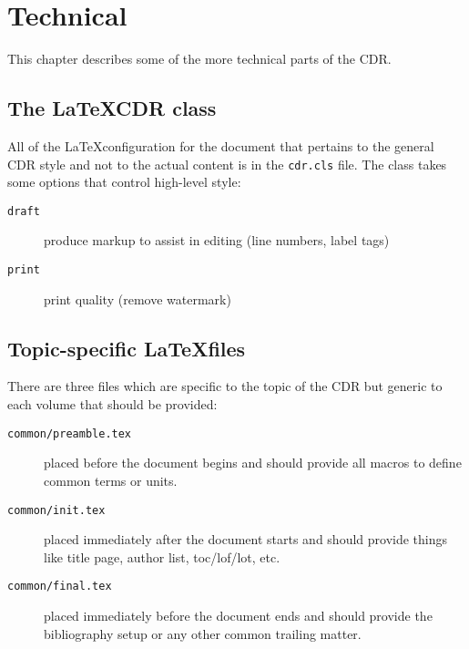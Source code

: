 \chapter{Technical}

This chapter describes some of the more technical parts of the CDR.

\section{The \LaTeX CDR class}

All of the \LaTeX configuration for the document that pertains to the general CDR style and not to the actual content is in the \texttt{cdr.cls} file.  The class takes some options that control high-level style:

\begin{description}
\item[\texttt{draft}] produce markup to assist in editing (line numbers, label tags)
\item[\texttt{print}] print quality (remove watermark)
\end{description}
\section{Topic-specific \LaTeX files}

There are three files which are specific to the topic of the CDR but generic to each volume that should be provided:

\begin{description}
\item[\texttt{common/preamble.tex}] placed before the document begins and should provide all macros to define common terms or units.
\item[\texttt{common/init.tex}] placed immediately after the document starts and should provide things like title page, author list, toc/lof/lot, etc.
\item[\texttt{common/final.tex}] placed immediately before the document ends and should provide the bibliography setup or any other common trailing matter.
\end{description}

